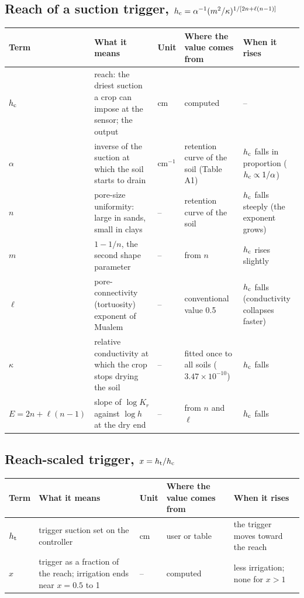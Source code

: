 \subsection*{Reach of a suction trigger, $h_{\mathrm{c}}=\alpha^{-1}(m^2/\kappa)^{1/[2n+\ell(n-1)]}$}
{\small\begin{longtable}{>{\raggedright\arraybackslash}p{}>{\raggedright\arraybackslash}p{}>{\raggedright\arraybackslash}p{}>{\raggedright\arraybackslash}p{}>{\raggedright\arraybackslash}p{}}\toprule Term & What it means & Unit & Where the value comes from & When it rises\\\midrule\endhead
$h_{\mathrm{c}}$ & reach: the driest suction a crop can impose at the sensor; the output & cm & computed & --\\
$\alpha$ & inverse of the suction at which the soil starts to drain & cm$^{-1}$ & retention curve of the soil (Table A1) & $h_{\mathrm{c}}$ falls in proportion ($h_{\mathrm{c}}\propto1/\alpha$)\\
$n$ & pore-size uniformity: large in sands, small in clays & -- & retention curve of the soil & $h_{\mathrm{c}}$ falls steeply (the exponent grows)\\
$m$ & $1-1/n$, the second shape parameter & -- & from $n$ & $h_{\mathrm{c}}$ rises slightly\\
$\ell$ & pore-connectivity (tortuosity) exponent of Mualem & -- & conventional value 0.5 & $h_{\mathrm{c}}$ falls (conductivity collapses faster)\\
$\kappa$ & relative conductivity at which the crop stops drying the soil & -- & fitted once to all soils ($3.47\times10^{-10}$) & $h_{\mathrm{c}}$ falls\\
$E=2n+\ell(n-1)$ & slope of $\log K_r$ against $\log h$ at the dry end & -- & from $n$ and $\ell$ & $h_{\mathrm{c}}$ falls\\
\bottomrule\end{longtable}}
\subsection*{Reach-scaled trigger, $x=h_{\mathrm{t}}/h_{\mathrm{c}}$}
{\small\begin{longtable}{>{\raggedright\arraybackslash}p{}>{\raggedright\arraybackslash}p{}>{\raggedright\arraybackslash}p{}>{\raggedright\arraybackslash}p{}>{\raggedright\arraybackslash}p{}}\toprule Term & What it means & Unit & Where the value comes from & When it rises\\\midrule\endhead
$h_{\mathrm{t}}$ & trigger suction set on the controller & cm & user or table & the trigger moves toward the reach\\
$x$ & trigger as a fraction of the reach; irrigation ends near $x=0.5$ to 1 & -- & computed & less irrigation; none for $x>1$\\
\bottomrule\end{longtable}}
